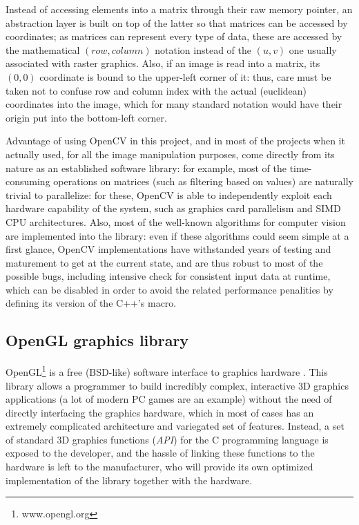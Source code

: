Instead of accessing elements into a matrix through their raw memory
pointer, an abstraction layer is built on top of the latter so that
matrices can be accessed by coordinates; as matrices can represent
every type of data, these are accessed by the mathematical  $(row, column)$ notation
instead of the $(u,v)$ one usually associated with raster
graphics. Also, if an image is read into a matrix, its $(0,0)$
coordinate is bound to the upper-left corner of it: thus, care must be
taken not to confuse row and column index with the actual (euclidean)
coordinates into the image, which for many standard notation would
have their origin put into the bottom-left corner. 

Advantage of using OpenCV in this project, and in most of the projects
when it actually used, for all the image
manipulation purposes, come directly from its nature as an established
software library: for example, most of the time-consuming operations
on matrices (such as filtering based on values) are naturally trivial
to parallelize: for these, OpenCV is able to independently exploit
each hardware capability of the system, such as graphics card
parallelism and SIMD CPU architectures. Also, most of the well-known
algorithms for computer vision are implemented into the library: even
if these algorithms could seem simple at a first glance, OpenCV
implementations have withstanded years of testing and maturement to get
at the current state, and are thus robust to most of the possible
bugs, including intensive check for consistent input data at runtime,
which can be disabled in order to avoid the related performance
penalities by defining its version of the C++'s  macro.

\subsection{OpenGL graphics library} \label{sec:opengl-intro}
OpenGL\footnote{www.opengl.org} is a free (BSD-like) software interface to graphics hardware \cite{opengl-book}. This
library allows a programmer to build incredibly complex, interactive 3D graphics
applications (a lot of modern PC games are an example) without the need of
directly interfacing the graphics hardware, which in most of cases has an
extremely complicated architecture and variegated set of features. Instead, a
set of standard 3D graphics functions (\emph{API}) for the C programming
language is exposed to the developer, and the hassle of linking these
functions to the hardware is left to the manufacturer, who will provide its own
optimized implementation of the library together with the hardware.

